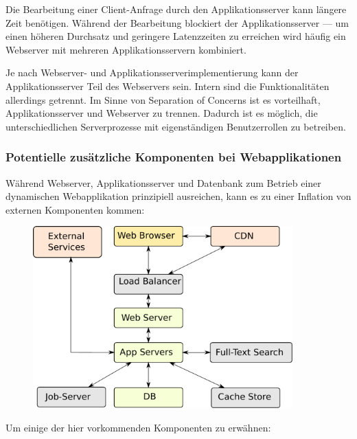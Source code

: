 Die Bearbeitung einer Client-Anfrage durch den Applikationsserver kann längere Zeit benötigen. Während der Bearbeitung blockiert der Applikationsserver --- um einen höheren Durchsatz und geringere Latenzzeiten zu erreichen wird häufig ein Webserver mit mehreren Applikationsservern kombiniert.

Je nach Webserver- und Applikationsserverimplementierung kann der Applikationsserver Teil des Webservers sein. Intern sind die Funktionalitäten allerdings getrennt. Im Sinne von Separation of Concerns ist es vorteilhaft, Applikationsserver und Webserver zu trennen. Dadurch ist es möglich, die unterschiedlichen Serverprozesse mit eigenständigen Benutzerrollen zu betreiben.

\subsubsection{Potentielle zusätzliche Komponenten bei Webapplikationen}

Während Webserver, Applikationsserver und Datenbank zum Betrieb einer dynamischen Webapplikation prinzipiell ausreichen, kann es zu einer Inflation von externen Komponenten kommen:

\begin{figure}[h!]
\includegraphics[width=10cm]{images/web_components.pdf}
\centering
\end{figure}

Um einige der hier vorkommenden Komponenten zu erwähnen:

